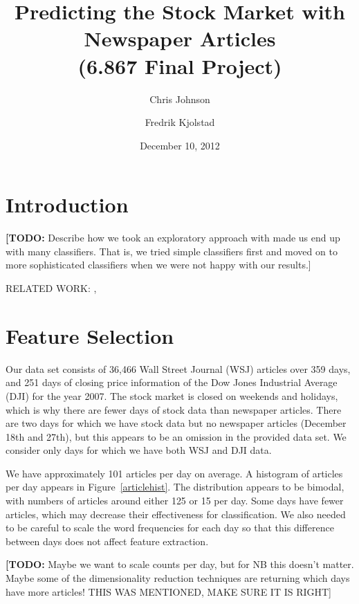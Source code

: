\documentclass[10pt]{article}
\def\TODO#1{\noindent\textbf{[TODO:} #1]}
\begin{document}
\title{Predicting the Stock Market with Newspaper Articles\\ (6.867 Final Project)}
\author{Chris Johnson \and Fredrik Kjolstad}
\date{December 10, 2012}
\maketitle

\begin{abstract}

\end{abstract}

\section{Introduction}
\TODO{Describe how we took an exploratory approach with made us end up with many classifiers. That is, we tried simple classifiers first and moved on to more sophisticated classifiers when we were not happy with our results.}

RELATED WORK: \cite{twitter}, \cite{mlstockmarket}

\section{Feature Selection}

Our data set consists of 36,466 Wall Street Journal (WSJ) articles over 359 days, and 251 days of closing price information of the Dow Jones Industrial Average (DJI) for the year 2007. The stock market is closed on weekends and holidays, which is why there are fewer days of stock data than newspaper articles. There are two days for which we have stock data but no newspaper articles (December 18th and 27th), but this appears to be an omission in the provided data set. We consider only days for which we have both WSJ and DJI data. 

We have approximately 101 articles per day on average. A histogram of articles per day appears in Figure~\ref{articlehist}. The distribution appears to be bimodal, with numbers of articles around either 125 or 15 per day. Some days have fewer articles, which may decrease their effectiveness for classification. We also needed to be careful to scale the word frequencies for each day so that this difference between days does not affect feature extraction.

\TODO{Maybe we want to scale counts per day, but for NB this doesn't matter. Maybe some of the dimensionality reduction techniques are returning which days have more articles! THIS WAS MENTIONED, MAKE SURE IT IS RIGHT}
\end{document}
